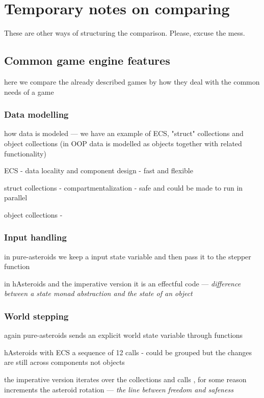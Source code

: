 \documentclass[
  digital, %
  color,   %
  table,   %
  oneside, %
  lof,     %
  lot,     %
]{fithesis3}
\begin{document}
{%
\chapter*{Temporary notes on comparing}

These are other ways of structuring the comparison. Please, excuse the mess.

\section*{Common game engine features}
here we compare the already described games by how they
deal with the common needs of a game

\subsection*{Data modelling}
how data is modeled --- we have an example of ECS, "struct" collections
and object collections (in OOP data is modelled as objects together with related functionality)

ECS - data locality and component design - fast and flexible

struct collections - compartmentalization - safe and could be made to run in parallel

object collections - 

\subsection*{Input handling}

in pure-asteroids we keep a input state variable and then pass it to the stepper function

in hAsteroids and the imperative version it is an effectful code
--- \emph{difference between a state monad abstraction and the state of an object}

\subsection*{World stepping}

again pure-asteroids sends an explicit world state variable through functions

hAsteroids with ECS a sequence of 12 calls - could be grouped but the
changes are still across components not objects

the imperative version iterates over the collections and calls ,
for some reason  increments the asteroid rotation
--- \emph{the line between freedom and safeness}

}
\end{document}
